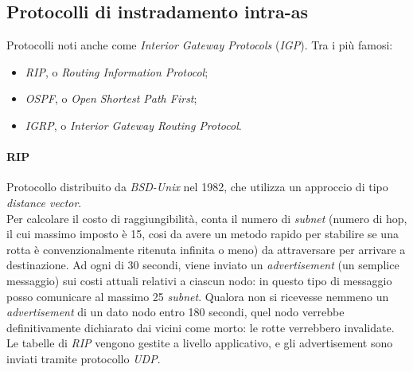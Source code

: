 \subsection{Protocolli di instradamento intra-as}
Protocolli noti anche come \textit{Interior Gateway Protocols} (\textit{IGP}). Tra i più famosi:
\begin{itemize}
	\item \textit{RIP}, o \textit{Routing Information Protocol};
	\item \textit{OSPF}, o \textit{Open Shortest Path First};
	\item \textit{IGRP}, o \textit{Interior Gateway Routing Protocol}.
\end{itemize}

\paragraph{RIP}
Protocollo distribuito da \textit{BSD-Unix} nel 1982, che utilizza un approccio di tipo \textit{distance vector}. \\
Per calcolare il costo di raggiungibilità, conta il numero di \textit{subnet} (numero di hop, il cui massimo imposto è 15, cosi da avere un metodo rapido per stabilire se una rotta è convenzionalmente ritenuta infinita o meno) da attraversare per arrivare a destinazione. Ad ogni di 30 secondi, viene inviato un \textit{advertisement} (un semplice messaggio) sui costi attuali relativi a ciascun nodo: in questo tipo di messaggio posso comunicare al massimo 25 \textit{subnet}.
Qualora non si ricevesse nemmeno un \textit{advertisement} di un dato nodo entro 180 secondi, quel nodo verrebbe definitivamente dichiarato dai vicini come morto: le rotte verrebbero invalidate. \\
Le tabelle di \textit{RIP} vengono gestite a livello applicativo, e gli advertisement sono inviati tramite protocollo \textit{UDP}.

